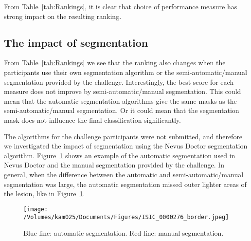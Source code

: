 \documentclass[a4paper,12pt]{article}
\begin{document}
From Table~\ref{tab:Rankings}, it is clear that choice of performance measure has strong impact on the resulting ranking.  

\subsection{The impact of segmentation}

From Table~\ref{tab:Rankings} we see that the ranking also changes when the participants use their own segmentation algorithm or the semi-automatic/manual segmentation provided by the challenge. 
Interestingly, the best score for each measure does not improve by semi-automatic/manual segmentation. 
This could mean that the automatic segmentation algorithms give the same masks as the semi-automatic/manual segmentation. 
Or it could mean that the segmentation mask does not influence the final classification significantly.

The algorithms for the challenge participants were not submitted, and therefore we investigated the impact of segmentation using the Nevus Doctor segmentation algorithm. 
Figure~\ref{fig:Border} shows an example of the automatic segmentation used in Nevus Doctor and the manual segmentation provided by the challenge. 
In general, when the difference between the automatic and semi-automatic/manual segmentation was large, the automatic segmentation missed outer lighter areas of the lesion, like in Figure~\ref{fig:Border}. 
\begin{figure}[h!]
     \texttt{[image: /Volumes/kam025/Documents/Figures/ISIC\_0000276\_border.jpeg]}
      \caption{Blue line: automatic segmentation. Red line: manual segmentation.}
       \label{fig:Border}
\end{figure}
\end{document}

